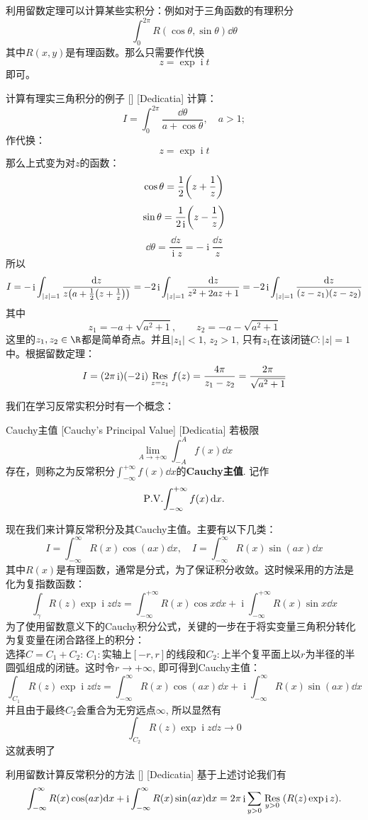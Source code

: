 \documentclass[UTF8]{ctexart}
\DeclareMathOperator{\ii}{\mathrm{i}}
\begin{document}
利用留数定理可以计算某些实积分：例如对于三角函数的有理积分
\[\int_0^{2\pi}R(\cos\theta,\sin\theta)\dd{\theta}\]
其中$R(x,y)$是有理函数。那么只需要作代换
\[z=\exp\ii t\]
即可。
\begin{xmp}
    [UUID]
    {计算有理实三角积分的例子}
    []
    [Dedicatia]
    计算：
    \[I=\int_0^{2\pi}\frac{\dd{\theta}}{a+\cos\theta},\quad a>1;\]
    作代换：
    \[z=\exp\ii t\]
    那么上式变为对$z$的函数：
    \[\cos\theta=\frac{1}{2}\qty(z+\frac{1}{z})\]
    \[\sin\theta=\frac{1}{2\ii}\qty(z-\frac{1}{z})\]
    \[\dd\theta=\frac{\dd{z}}{\ii z}=-\ii\frac{\dd{z}}{z}\]
    所以
    \[I=-\ii\int_{|z|=1}\frac{\dd{z}}{z\pqty{a+\frac{1}{2}\qty(z+\frac{1}{z})}}=-2\ii\int_{|z|=1}\frac{\dd{z}}{z^2+2az+1}=-2\ii\int_{|z|=1}\frac{\dd{z}}{(z-z_1)(z-z_2)}\]
    其中
    \[z_1=-a+\sqrt{a^2+1},\qquad z_2=-a-\sqrt{a^2+1}\]
    这里的$z_1, z_2\in\R$都是简单奇点。并且$|z_1|<1$, $z_2>1$, 只有$z_1$在该闭链$C:|z|=1$中。根据留数定理：
    \[I=(2\pi\ii)(-2\ii)\underset{z=z_1}{\Res}f(z)=\frac{4\pi}{z_1-z_2}=\frac{2\pi}{\sqrt{a^2+1}}\]
\end{xmp}
我们在学习反常实积分时有一个概念：
\begin{dfn}
    [UUID]
    {Cauchy主值}
    [Cauchy's Principal Value]
    [Dedicatia]
    若极限\[\lim_{A\to+\infty}\int_{-A}^{A}f(x)\dd{x}\]存在，则称之为反常积分$\int_{-\infty}^{+\infty}f(x)\dd{x}$的\textbf{Cauchy主值}. 记作
    \[\PV{\int_{-\infty}^{+\infty}f(x)\dd{x}}.\]
\end{dfn}
现在我们来计算反常积分及其Cauchy主值。主要有以下几类：
$$I = \int_{-\infty}^{\infty} R(x) \cos(ax) \dd x, \quad I = \int_{-\infty}^{\infty} R(x) \sin(ax) \dd x$$
其中$R(x)$是有理函数，通常是分式，为了保证积分收敛。这时候采用的方法是化为复指数函数：
\[\int_{\gamma}R(z)\exp\ii z\dd{z}=\int_{-\infty}^{+\infty}R(x)\cos x\dd{x}+\ii\int_{-\infty}^{+\infty}R(x)\sin x\dd{x}\]
为了使用留数意义下的Cauchy积分公式，关键的一步在于将实变量三角积分转化为复变量在闭合路径上的积分：\\
选择$C=C_1+C_2$: $C_1:$实轴上$[-r,r]$的线段和$C_2:$上半个复平面上以$r$为半径的半圆弧组成的闭链。这时令$r\to +\infty$, 即可得到Cauchy主值：
\[\int_{C_1}R(z)\exp\ii z\dd{z}=\int_{-\infty}^{\infty} R(x) \cos(ax) \dd x +\ii\int_{-\infty}^{\infty} R(x) \sin(ax) \dd x \]
并且由于最终$C_2$会重合为无穷远点$\infty$, 所以显然有
\[\int_{C_2}R(z)\exp\ii z\dd{z}\to 0\]
这就表明了
\begin{crl}
    [UUID]
    {利用留数计算反常积分的方法}
    []
    [Dedicatia]
    基于上述讨论我们有
    \[\int_{-\infty}^{\infty} R(x) \cos(ax) \dd x +\ii\int_{-\infty}^{\infty} R(x) \sin(ax) \dd x =2\pi\ii\sum_{y>0}\underset{y>0}{\Res}(R(z)\exp\ii z).\]
\end{crl}
\end{document}
